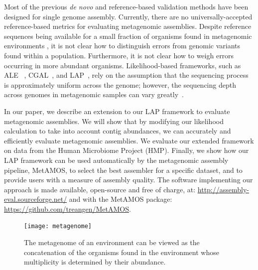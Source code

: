 Most of the previous \emph{de novo} and reference-based validation methods have been designed for single genome assembly.
Currently, there are no universally-accepted reference-based metrics for evaluating metagenomic assemblies.
Despite reference sequences being available for a small fraction of organisms found in metagenomic environments \cite{angly2006marine,dinsdale2008functional}, it is not clear how to distinguish errors from genomic variants found within a population.
Furthermore, it is not clear how to weigh errors occurring in more abundant organisms.
Likelihood-based frameworks, such as ALE ~\cite{clark2013ale}, CGAL~\cite{rahman2013cgal}, and LAP~\cite{LAP}, rely on the assumption that the sequencing process is approximately uniform across the genome; however, the sequencing depth across genomes in metagenomic samples can vary greatly~\cite{carrigg2007dna,krsek1999comparison,morgan2010metagenomic,temperton2009bias}.


In our paper, we describe an extension to our LAP framework to evaluate metagenomic assemblies.
We will show that by modifying our likelihood calculation to take into account contig abundances, we can accurately and efficiently evaluate metagenomic assemblies.
We evaluate our extended framework on data from the Human Microbiome Project (HMP).
Finally, we show how our LAP framework can be used automatically by the metagenomic assembly pipeline, MetAMOS\cite{treangen2013metamos}, to select the best assembler for a specific dataset, and to provide users with a measure of assembly quality.
The software implementing our approach is made available, open-source and free of charge, at: \url{http://assembly-eval.sourceforge.net/} and with the MetAMOS package: \url{https://github.com/treangen/MetAMOS}.

 

\begin{figure}
\begin{center}
\texttt{[image: metagenome]}
\end{center}
\renewcommand{\baselinestretch}{1}
\small\normalsize
\begin{quote}
\caption[The metagenome of an environment]{The metagenome of an environment can be viewed as the concatenation of the organisms found in the environment whose multiplicity is determined by their abundance. \label{fig:metagenome}}
\end{quote}
\end{figure} 
\renewcommand{\baselinestretch}{2}
\small\normalsize
\newpage

